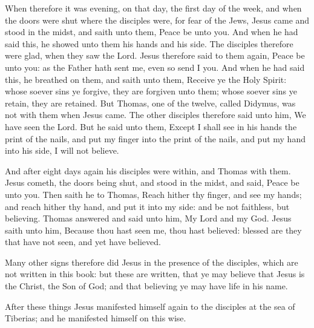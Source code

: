 When therefore it was evening, on that day, the first day of the week, and when the doors were shut where the disciples were, for fear of the Jews, Jesus came and stood in the midst, and saith unto them, Peace be unto you. And when he had said this, he showed unto them his hands and his side. The disciples therefore were glad, when they saw the Lord. Jesus therefore said to them again, Peace be unto you: as the Father hath sent me, even so send I you. And when he had said this, he breathed on them, and saith unto them, Receive ye the Holy Spirit: whose soever sins ye forgive, they are forgiven unto them; whose soever sins ye retain, they are retained.  But Thomas, one of the twelve, called Didymus, was not with them when Jesus came. The other disciples therefore said unto him, We have seen the Lord. But he said unto them, Except I shall see in his hands the print of the nails, and put my finger into the print of the nails, and put my hand into his side, I will not believe.  

And after eight days again his disciples were within, and Thomas with them. Jesus cometh, the doors being shut, and stood in the midst, and said, Peace be unto you. Then saith he to Thomas, Reach hither thy finger, and see my hands; and reach hither thy hand, and put it into my side: and be not faithless, but believing. Thomas answered and said unto him, My Lord and my God. Jesus saith unto him, Because thou hast seen me, thou hast believed: blessed are they that have not seen, and yet have believed.  

Many other signs therefore did Jesus in the presence of the disciples, which are not written in this book: but these are written, that ye may believe that Jesus is the Christ, the Son of God; and that believing ye may have life in his name. 



After these things Jesus manifested himself again to the disciples at the sea of Tiberias; and he manifested himself on this wise. 

